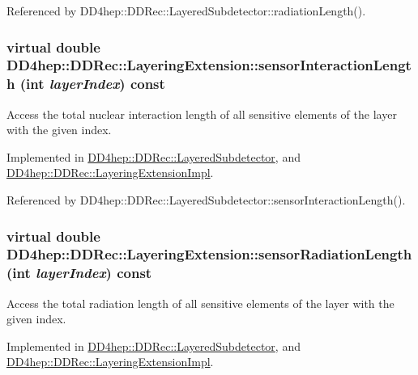 Referenced by DD4hep::DDRec::LayeredSubdetector::radiationLength().\hypertarget{class_d_d4hep_1_1_d_d_rec_1_1_layering_extension_a99d3faa45e42d0a34635ea7f3ac2c038}{
\subsubsection[{sensorInteractionLength}]{\setlength{\rightskip}{0pt plus 5cm}virtual double DD4hep::DDRec::LayeringExtension::sensorInteractionLength (int {\em layerIndex}) const}}
\label{class_d_d4hep_1_1_d_d_rec_1_1_layering_extension_a99d3faa45e42d0a34635ea7f3ac2c038}


Access the total nuclear interaction length of all sensitive elements of the layer with the given index. 

Implemented in \hyperlink{class_d_d4hep_1_1_d_d_rec_1_1_layered_subdetector_adbf23ebe50a26ecef9dd053b4066ed4d}{DD4hep::DDRec::LayeredSubdetector}, and \hyperlink{class_d_d4hep_1_1_d_d_rec_1_1_layering_extension_impl_a8746d049cc1aac662e60a1e72496f2e7}{DD4hep::DDRec::LayeringExtensionImpl}.

Referenced by DD4hep::DDRec::LayeredSubdetector::sensorInteractionLength().\hypertarget{class_d_d4hep_1_1_d_d_rec_1_1_layering_extension_a1328587b943abe82353de131d9fac071}{
\subsubsection[{sensorRadiationLength}]{\setlength{\rightskip}{0pt plus 5cm}virtual double DD4hep::DDRec::LayeringExtension::sensorRadiationLength (int {\em layerIndex}) const}}
\label{class_d_d4hep_1_1_d_d_rec_1_1_layering_extension_a1328587b943abe82353de131d9fac071}


Access the total radiation length of all sensitive elements of the layer with the given index. 

Implemented in \hyperlink{class_d_d4hep_1_1_d_d_rec_1_1_layered_subdetector_a2b1079b698e6ed15af85e1558f893540}{DD4hep::DDRec::LayeredSubdetector}, and \hyperlink{class_d_d4hep_1_1_d_d_rec_1_1_layering_extension_impl_a50cbe11650ef7283353a6ba6a4f564e7}{DD4hep::DDRec::LayeringExtensionImpl}.

